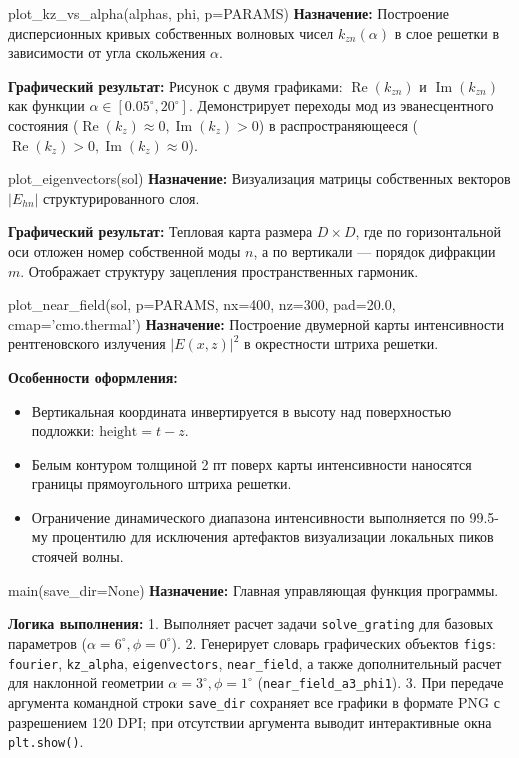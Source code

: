 \documentclass[a4paper,11pt]{article}
\begin{document}
\begin{funcbox}{plot\_kz\_vs\_alpha(alphas, phi, p=PARAMS)}
\textbf{Назначение:} Построение дисперсионных кривых собственных волновых чисел $k_{zn}(\alpha)$ в слое решетки в зависимости от угла скольжения $\alpha$.

\textbf{Графический результат:} Рисунок с двумя графиками: $\operatorname{Re}(k_{zn})$ и $\operatorname{Im}(k_{zn})$ как функции $\alpha \in [0.05^\circ, 20^\circ]$. Демонстрирует переходы мод из эванесцентного состояния ($\operatorname{Re}(k_z) \approx 0, \operatorname{Im}(k_z) > 0$) в распространяющееся ($\operatorname{Re}(k_z) > 0, \operatorname{Im}(k_z) \approx 0$).
\end{funcbox}

\begin{funcbox}{plot\_eigenvectors(sol)}
\textbf{Назначение:} Визуализация матрицы собственных векторов $|E_{hn}|$ структурированного слоя.

\textbf{Графический результат:} Тепловая карта размера $D \times D$, где по горизонтальной оси отложен номер собственной моды $n$, а по вертикали --- порядок дифракции $m$. Отображает структуру зацепления пространственных гармоник.
\end{funcbox}

\begin{funcbox}{plot\_near\_field(sol, p=PARAMS, nx=400, nz=300, pad=20.0, cmap='cmo.thermal')}
\textbf{Назначение:} Построение двумерной карты интенсивности рентгеновского излучения $|E(x, z)|^2$ в окрестности штриха решетки.

\textbf{Особенности оформления:}
\begin{itemize}
    \item Вертикальная координата инвертируется в высоту над поверхностью подложки: $\text{height} = t - z$.
    \item Белым контуром толщиной 2 пт поверх карты интенсивности наносятся границы прямоугольного штриха решетки.
    \item Ограничение динамического диапазона интенсивности выполняется по 99.5-му процентилю для исключения артефактов визуализации локальных пиков стоячей волны.
\end{itemize}
\end{funcbox}

\begin{funcbox}{main(save\_dir=None)}
\textbf{Назначение:} Главная управляющая функция программы.

\textbf{Логика выполнения:}
1. Выполняет расчет задачи \texttt{solve\_grating} для базовых параметров ($\alpha = 6^\circ, \phi = 0^\circ$).
2. Генерирует словарь графических объектов \texttt{figs}: \texttt{fourier}, \texttt{kz\_alpha}, \texttt{eigenvectors}, \texttt{near\_field}, а также дополнительный расчет для наклонной геометрии $\alpha = 3^\circ, \phi = 1^\circ$ (\texttt{near\_field\_a3\_phi1}).
3. При передаче аргумента командной строки \texttt{save\_dir} сохраняет все графики в формате PNG с разрешением 120 DPI; при отсутствии аргумента выводит интерактивные окна \texttt{plt.show()}.
\end{funcbox}
\end{document}
